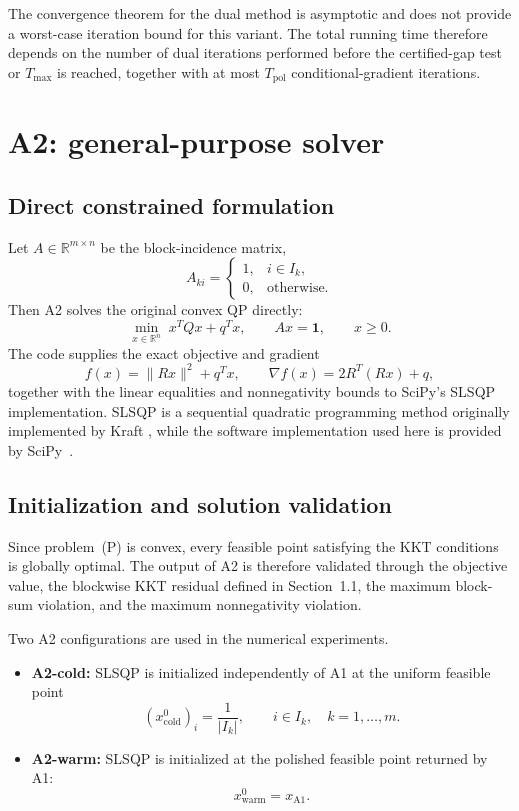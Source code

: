 \documentclass[12pt]{article}
\newcommand{\R}{\mathbb{R}}
\begin{document}
The convergence theorem for the dual method is asymptotic and does
not provide a worst-case iteration bound for this variant. The total
running time therefore depends on the number of dual iterations
performed before the certified-gap test or $T_{\max}$ is reached,
together with at most $T_{\mathrm{pol}}$ conditional-gradient
iterations.

\section{A2: general-purpose solver}

\subsection{Direct constrained formulation}

Let $A\in\R^{m\times n}$ be the block-incidence matrix,
\[
A_{ki}=\begin{cases}1,&i\in I_k,\\0,&\text{otherwise.}\end{cases}
\]
Then A2 solves the original convex QP directly:
\begin{equation}
\min_{x\in\R^n}\;x^TQx+q^Tx,
\qquad
Ax=\mathbf 1,
\qquad
x\ge0.
\label{eq:a2-formulation}
\end{equation}
The code supplies the exact objective and gradient \[ f(x)=\|Rx\|^2+q^Tx, \qquad \nabla f(x)=2R^T(Rx)+q, \] together with the linear equalities and nonnegativity bounds to SciPy's SLSQP implementation. SLSQP is a sequential quadratic programming method originally implemented by Kraft \cite{kraft1988slsqp}, while the software implementation used here is provided by SciPy~\cite{virtanen2020scipy}.

\subsection{Initialization and solution validation}

Since problem~(P) is convex, every feasible point satisfying the KKT
conditions is globally optimal. The output of A2 is therefore
validated through the objective value, the blockwise KKT residual
defined in Section~1.1, the maximum block-sum violation, and the
maximum nonnegativity violation.

Two A2 configurations are used in the numerical experiments.

\begin{itemize}
    \item \textbf{A2-cold:} SLSQP is initialized independently of A1
    at the uniform feasible point
    \[
    (x^{0}_{\mathrm{cold}})_i
    =
    \frac{1}{|I_k|},
    \qquad i\in I_k,
    \quad k=1,\ldots,m.
    \]

    \item \textbf{A2-warm:} SLSQP is initialized at the polished
    feasible point returned by A1:
    \[
    x^{0}_{\mathrm{warm}}
    =
    x_{\mathrm{A1}}.
    \]
\end{itemize}
\end{document}
